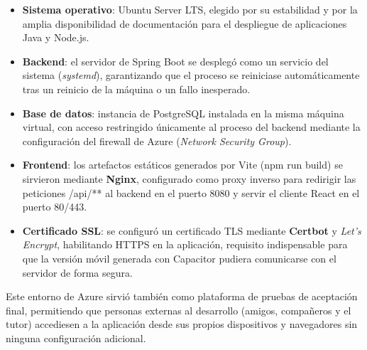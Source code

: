\begin{itemize}
    \item \textbf{Sistema operativo}: Ubuntu Server LTS, elegido por su estabilidad y por la amplia disponibilidad de documentación para el despliegue de aplicaciones Java y Node.js.
    \item \textbf{Backend}: el servidor de Spring Boot se desplegó como un servicio del sistema (\emph{systemd}), garantizando que el proceso se reiniciase automáticamente tras un reinicio de la máquina o un fallo inesperado.
    \item \textbf{Base de datos}: instancia de PostgreSQL instalada en la misma máquina virtual, con acceso restringido únicamente al proceso del backend mediante la configuración del firewall de Azure (\emph{Network Security Group}).
    \item \textbf{Frontend}: los artefactos estáticos generados por Vite (npm run build) se sirvieron mediante \textbf{Nginx}, configurado como proxy inverso para redirigir las peticiones /api/** al backend en el puerto 8080 y servir el cliente React en el puerto 80/443.
    \item \textbf{Certificado SSL}: se configuró un certificado TLS mediante \textbf{Certbot} y \emph{Let's Encrypt}, habilitando HTTPS en la aplicación, requisito indispensable para que la versión móvil generada con Capacitor pudiera comunicarse con el servidor de forma segura.
\end{itemize}

Este entorno de Azure sirvió también como plataforma de pruebas de aceptación final, permitiendo que personas externas al desarrollo (amigos, compañeros y el tutor) accediesen a la aplicación desde sus propios dispositivos y navegadores sin ninguna configuración adicional.
